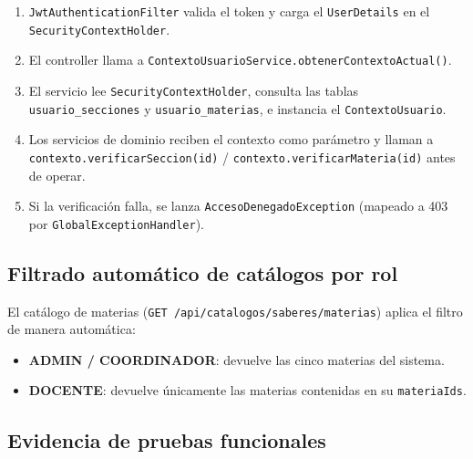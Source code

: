 \documentclass[11pt,a4paper,oneside]{article}
\newcommand{\code}[1]{\texttt{\small #1}}
\begin{document}
\begin{enumerate}[leftmargin=*]
  \item \code{JwtAuthenticationFilter} valida el token y carga el \code{UserDetails} en el
        \code{SecurityContextHolder}.
  \item El controller llama a \code{ContextoUsuarioService.obtenerContextoActual()}.
  \item El servicio lee \code{SecurityContextHolder}, consulta las tablas
        \code{usuario\_secciones} y \code{usuario\_materias}, e instancia el
        \code{ContextoUsuario}.
  \item Los servicios de dominio reciben el contexto como parámetro y llaman a
        \code{contexto.verificarSeccion(id)} / \code{contexto.verificarMateria(id)} antes de
        operar.
  \item Si la verificación falla, se lanza \code{AccesoDenegadoException} (mapeado a 403
        por \code{GlobalExceptionHandler}).
\end{enumerate}

\subsection{Filtrado automático de catálogos por rol}

El catálogo de materias (\code{GET /api/catalogos/saberes/materias}) aplica el filtro de
manera automática:

\begin{itemize}[leftmargin=*]
  \item \textbf{ADMIN / COORDINADOR}: devuelve las cinco materias del sistema.
  \item \textbf{DOCENTE}: devuelve únicamente las materias contenidas en su \code{materiaIds}.
\end{itemize}

\subsection{Evidencia de pruebas funcionales}
\end{document}
